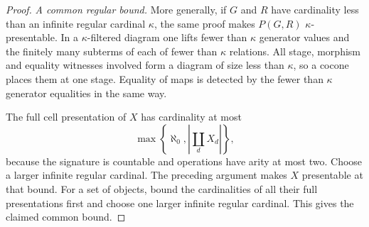 \begin{proof}
\emph{A common regular bound.}
More generally, if $G$ and $R$ have cardinality less than an
infinite regular cardinal $\kappa$, the same proof makes
$P(G,R)$ $\kappa$-presentable. In a $\kappa$-filtered diagram
one lifts fewer than $\kappa$ generator values and the
finitely many subterms of each of fewer than $\kappa$
relations. All stage, morphism and equality witnesses involved
form a diagram of size less than $\kappa$, so a cocone places
them at one stage. Equality of maps is detected by the
fewer than $\kappa$ generator equalities in the same way.

The full cell presentation of $X$ has cardinality at most
\[
 \max\left\{\aleph_0,\left|\coprod_d X_d\right|\right\},
\]
because the signature is countable and operations have arity
at most two. Choose a larger infinite regular cardinal.
The preceding argument makes $X$ presentable at that bound.
For a set of objects, bound the cardinalities of all their
full presentations first and choose one larger infinite
regular cardinal. This gives the claimed common bound.
\end{proof}
